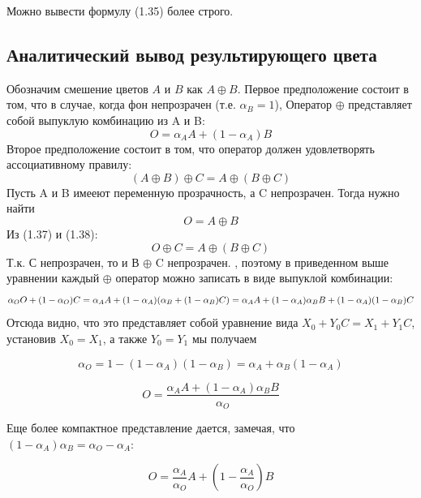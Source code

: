Можно вывести формулу (1.35) более строго. 

\subsection{Аналитический вывод результирующего цвета}
Обозначим смешение цветов $A$ и $B$ как $A \oplus B$. 
Первое предположение состоит в том, что в случае, когда фон непрозрачен (т.е. $\alpha _ {B} = 1$), Оператор $\oplus$ представляет собой выпуклую комбинацию из A и B:
\begin{equation}
O= \alpha_{A}A + (1- \alpha_{A})B
\end{equation}
Второе предположение состоит в том, что оператор должен удовлетворять ассоциативному правилу:
\begin{equation}
(A \oplus B) \oplus C = A \oplus (B \oplus C)
\end{equation}
Пусть A и B имееют переменную прозрачность, а C непрозрачен. Тогда нужно найти
\begin{equation}
O = A \oplus B
\end{equation}
Из (1.37) и (1.38):
\begin{equation}
O \oplus C = A \oplus (B \oplus C)
\end{equation}
Т.к. С непрозрачен, то и В $\oplus$ C непрозрачен. , поэтому в приведенном выше уравнении каждый  $\oplus$ оператор можно записать в виде выпуклой комбинации:
\begin{equation}
\alpha_{O}O + (1 - \alpha_{O}) C = \alpha_{A}A + (1 - \alpha_{A})(\alpha_{B} + (1 - \alpha_{B})C) \\
= \alpha_{A}A + (1 - \alpha_{A})\alpha_{B}B + (1-\alpha_{A})(1-\alpha_{B})C
\end{equation}
Отсюда видно, что это представляет собой уравнение вида $ X_{0} + Y_{0} C = X_{1} + Y_{1} C$, установив  $X_{0} = X_{1}$, а также $Y_{0} = Y_ {1}$ мы получаем

\begin{equation}
\alpha_{O} = 1 - (1 - \alpha_{A})(1 - \alpha_{B}) =  \alpha_{A} + \alpha_{B}(1-\alpha_{A})
\end{equation}

\begin{equation}
O = \frac{\alpha_{A}A + (1-\alpha_{A})\alpha_{B}B}{\alpha_{O}}
\end{equation}

Еще более компактное представление дается, замечая, что $(1- \alpha_{A}) \alpha_{B} = \alpha_{O} - \alpha_{A}$:

\begin{equation}
O = \frac{\alpha_{A}}{\alpha_{O}}A + (1-\frac{\alpha_{A}}{\alpha_{O}})B
\end{equation}

